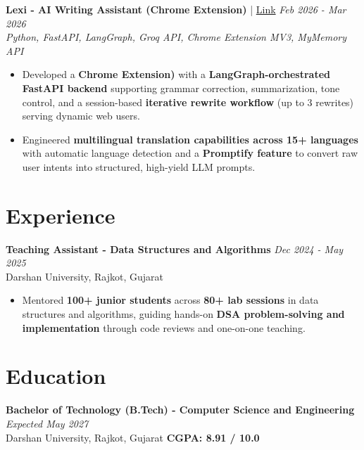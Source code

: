 \documentclass[a4paper,10pt]{article}
\begin{document}
\textbf{Lexi - AI Writing Assistant (Chrome Extension)} | \href{https://github.com/hetbhalani/Lexi}{Link} \hfill \textit{Feb 2026 - Mar 2026} \\
\textit{Python, FastAPI, LangGraph, Groq API, Chrome Extension MV3, MyMemory API}
\begin{itemize}[leftmargin=2em]
    \item Developed a \textbf{Chrome Extension)} with a \textbf{LangGraph-orchestrated FastAPI backend} supporting grammar correction, summarization, tone control, and a session-based \textbf{iterative rewrite workflow} (up to 3 rewrites) serving dynamic web users.
    \item Engineered \textbf{multilingual translation capabilities across 15+ languages} with automatic language detection and a \textbf{Promptify feature} to convert raw user intents into structured, high-yield LLM prompts.
\end{itemize}

\section*{Experience}

\textbf{Teaching Assistant - Data Structures and Algorithms} \hfill \textit{Dec 2024 - May 2025} \\
Darshan University, Rajkot, Gujarat
\begin{itemize}[leftmargin=2em]
    \item Mentored \textbf{100+ junior students} across \textbf{80+ lab sessions} in data structures and algorithms, guiding hands-on \textbf{DSA problem-solving and implementation} through code reviews and one-on-one teaching.
\end{itemize}

\section*{Education}

\textbf{Bachelor of Technology (B.Tech) - Computer Science and Engineering} \hfill \textit{Expected May 2027} \\
Darshan University, Rajkot, Gujarat \hfill \textbf{CGPA: 8.91 / 10.0}

\end{document}
